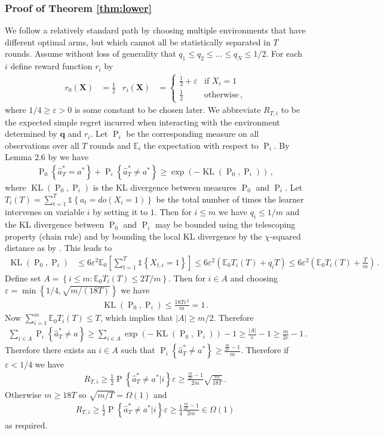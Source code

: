 \documentclass[11pt,a4paper,oneside]{book}
\newcommand{\KL}{\operatorname{KL}}
\newcommand{\EE}{\mathbb E}
\newcommand{\Pn}[2]{\operatorname{P}\left\{#2|#1\right\}}
\newcommand{\Ps}{\operatorname{P}}
\newcommand{\Pri}[1]{\operatorname{P}_i\left\{#1\right\}}
\newcommand{\Prz}[1]{\operatorname{P}_0\left\{#1\right\}}
\newcommand{\set}[1]{\left\{#1\right\}}
\newcommand{\ind}[1]{\mathds{1}\!\!\set{#1}}
\newcommand{\eq}[1]{\begin{align*}#1\end{align*}}
\theoremstyle{plain}
\theoremstyle{definition}
\let\epsilon\varepsilon
\begin{document}
\subsubsection{Proof of Theorem \ref{thm:lower}}\label{sec:thm:lower}

We follow a relatively standard path by choosing multiple environments that have different optimal arms, but which cannot all be statistically
separated in $T$ rounds.
Assume without loss of generality that $q_1 \leq q_2 \leq \ldots \leq q_N \leq 1/2$.
For each $i$ define reward function $r_i$ by
\eq{
r_0(\boldsymbol{X}) &= \frac{1}{2} &
r_i(\boldsymbol{X}) &= \begin{cases}
\frac{1}{2} + \epsilon & \text{if } X_i = 1 \\
\frac{1}{2} & \text{otherwise}\,,
\end{cases}
}
where $1/4 \geq \epsilon > 0$ is some constant to be chosen later.
We abbreviate $R_{T,i}$ to be the expected simple regret incurred when interacting with the
environment determined by $\boldsymbol{q}$ and $r_i$. Let $\operatorname{P}_i$ be the corresponding measure
on all observations over all $T$ rounds and $\EE_i$ the expectation with respect to $\operatorname{P}_i$. By Lemma 2.6 by \citet{Tsy08} we have
\eq{
\Prz{\hat a^*_T = a^*} + \Pri{\hat a^*_T \neq a^*} \geq \exp\left(-\KL(\operatorname{P}_0, \operatorname{P}_i)\right)\,,
}
where $\KL(\Ps_0, \Ps_i)$ is the KL divergence between measures $\operatorname{P}_0$ and $\operatorname{P}_i$.
Let $T_i(T) = \sum_{t=1}^T \ind{a_t = do(X_i = 1)}$ be the total number of times the learner intervenes on variable $i$ by setting it to $1$.
Then for $i \leq m$ we have $q_i \leq 1/m$ and the KL divergence between $\Ps_0$ and $\Ps_i$ may be bounded using the telescoping property (chain rule) and
by bounding the local KL divergence by the $\chi$-squared distance as by \citet{Auer1995}. This leads to 
\eq{
\KL(\Ps_0, \Ps_i) 
&\leq 6\epsilon^2 \EE_0\left[\sum_{t=1}^T \ind{X_{t,i} = 1}\right] 
\leq 6\epsilon^2 \left(\EE_0 T_i(T) + q_i T\right) 
\leq 6\epsilon^2 \left(\EE_0 T_i(T) + \frac{T}{m}\right)\,.
}
Define set $A = \set{i \leq m : \EE_0 T_i(T) \leq 2T / m}$.
Then for $i \in A$ and choosing $\epsilon = \min\set{1/4, \sqrt{m/(18T)}}$ we have
\eq{
\KL(\Ps_0, \Ps_i) \leq \frac{18T\epsilon^2}{m} = 1\,. 
}
Now $\sum_{i=1}^m \EE_0 T_i(T) \leq T$, which implies that $|A| \geq m/2$.
Therefore
\eq{
\sum_{i \in A} \Pri{\hat a^*_T \neq a} 
\geq \sum_{i \in A} \exp\left(-\KL(\Ps_0, \Ps_i)\right) - 1
\geq \frac{|A|}{e} - 1 
\geq \frac{m}{2e} - 1\,.
}
Therefore there exists an $i \in A$ such that
$\Pri{\hat a^*_T \neq a^*} \geq \frac{\frac{m}{2e} - 1}{m}$. 
Therefore if $\epsilon < 1/4$ we have
\eq{
R_{T,i} \geq \frac{1}{2} \Pn{i}{\hat a^*_T \neq a^*} \epsilon \geq \frac{\frac{m}{2e} - 1}{2m} \sqrt{\frac{m}{18T}}\,.
}
Otherwise $m \geq 18T$ so $\sqrt{m/T} = \Omega(1)$ and
\eq{
R_{T,i} \geq \frac{1}{2} \Pn{i}{\hat a^*_T \neq a^*} \epsilon \geq \frac{1}{4} \frac{\frac{m}{2e} - 1}{2m} \in \Omega(1) 
}
as required.
\end{document}
